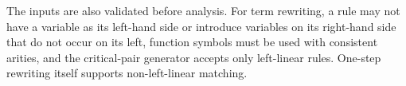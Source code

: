 The inputs are also validated before analysis. For term rewriting, a rule may not have a variable as its left-hand side or introduce variables on its right-hand side that do not occur on its left, function symbols must be used with consistent arities, and the critical-pair generator accepts only left-linear rules. One-step rewriting itself supports non-left-linear matching.
